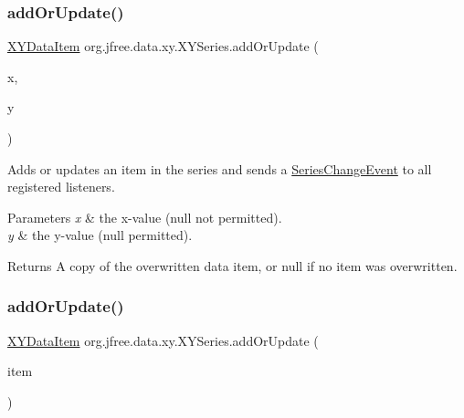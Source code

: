 \subsubsection{\texorpdfstring{add\+Or\+Update()}{addOrUpdate()}\hspace{0.1cm}{\footnotesize\ttfamily [2/3]}}
{\footnotesize\ttfamily \mbox{\hyperlink{classorg_1_1jfree_1_1data_1_1xy_1_1_x_y_data_item}{X\+Y\+Data\+Item}} org.\+jfree.\+data.\+xy.\+X\+Y\+Series.\+add\+Or\+Update (\begin{DoxyParamCaption}\item[{Number}]{x,  }\item[{Number}]{y }\end{DoxyParamCaption})}

Adds or updates an item in the series and sends a \mbox{\hyperlink{}{Series\+Change\+Event}} to all registered listeners.


\begin{DoxyParams}{Parameters}
{\em x} & the x-\/value ({\ttfamily null} not permitted). \\
\hline
{\em y} & the y-\/value ({\ttfamily null} permitted).\\
\hline
\end{DoxyParams}
\begin{DoxyReturn}{Returns}
A copy of the overwritten data item, or {\ttfamily null} if no item was overwritten. 
\end{DoxyReturn}
\mbox{\label{classorg_1_1jfree_1_1data_1_1xy_1_1_x_y_series_af7760a410b50c04ce4a76249d23c57d1}} 
\subsubsection{\texorpdfstring{add\+Or\+Update()}{addOrUpdate()}\hspace{0.1cm}{\footnotesize\ttfamily [3/3]}}
{\footnotesize\ttfamily \mbox{\hyperlink{classorg_1_1jfree_1_1data_1_1xy_1_1_x_y_data_item}{X\+Y\+Data\+Item}} org.\+jfree.\+data.\+xy.\+X\+Y\+Series.\+add\+Or\+Update (\begin{DoxyParamCaption}\item[{\mbox{\hyperlink{classorg_1_1jfree_1_1data_1_1xy_1_1_x_y_data_item}{X\+Y\+Data\+Item}}}]{item }\end{DoxyParamCaption})}

